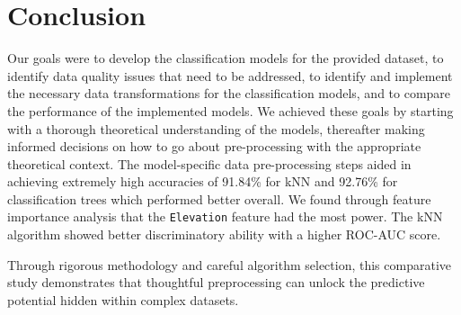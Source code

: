 \documentclass[10pt, conference]{IEEEtran}
\begin{document}
\section{Conclusion}
Our goals were to develop the classification models for the provided dataset, to identify data quality issues that need to be addressed, to identify and implement the necessary data transformations for the classification models, and to compare the performance of the implemented models. We achieved these goals by starting with a thorough theoretical understanding of the models, thereafter making informed decisions on how to go about pre-processing with the appropriate theoretical context. The model-specific data pre-processing steps aided in achieving extremely high accuracies of 91.84\% for kNN and 92.76\% for classification trees which performed better overall. We found through feature importance analysis that the \texttt{Elevation} feature had the most power. The kNN algorithm showed better discriminatory ability with a higher ROC-AUC score.

Through rigorous methodology and careful algorithm selection, this comparative study demonstrates that thoughtful preprocessing can unlock the predictive potential hidden within complex datasets.



\end{document}
